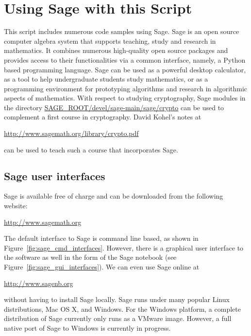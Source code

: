 \chapter*{Using Sage with this Script}

This script includes numerous code samples using Sage. Sage is an open
source computer algebra system that supports teaching, study and
research in mathematics.  It combines numerous high-quality open
source packages and provides access to their functionalities via a
common interface, namely, a Python based programming language.  Sage
can be used as a powerful desktop calculator, as a tool to help
undergraduate students study mathematics, or as a programming
environment for prototyping algorithms and research in algorithmic
aspects of mathematics.  With respect to studying cryptography, Sage
modules in the directory  \url{SAGE_ROOT/devel/sage-main/sage/crypto}
can be used to complement a first course in cryptography.  David
Kohel's notes at
\begin{center}
  \url{http://www.sagemath.org/library/crypto.pdf}
\end{center}
can be used to teach such a course that incorporates Sage.


\section*{Sage user interfaces}

Sage is available free of charge and can be downloaded from the
following website:
\begin{center}
  \url{http://www.sagemath.org} \\
\end{center}
The default interface to Sage is command line based, as shown in
Figure~\ref{fig:sage_cmd_interfaces}. However, there is a
graphical user interface to the software as well in the form of the
Sage notebook (see Figure~\ref{fig:sage_gui_interfaces}). We can even
use Sage online at
\begin{center}
\url{http://www.sagenb.org}
\end{center}
without having to install Sage locally. Sage runs under many popular
Linux distributions, Mac OS X, and Windows. For the Windows platform,
a complete distribution of Sage currently only runs as a VMware
image. However, a full native port of Sage to Windows is currently in
progress.

